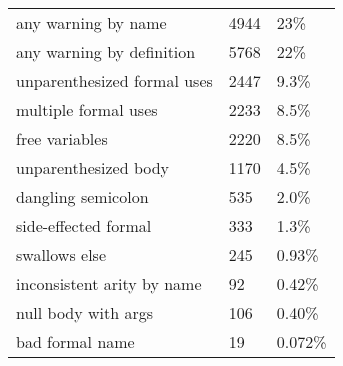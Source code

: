 \begin{tabular}{|l|l|l|} \hline
any warning by name & 4944 & 23\% \\ 
any warning by definition & 5768 & 22\% \\ 
unparenthesized formal uses & 2447 & 9.3\% \\ 
multiple formal uses & 2233 & 8.5\% \\ 
free variables & 2220 & 8.5\% \\ 
unparenthesized body & 1170 & 4.5\% \\ 
dangling semicolon & 535 & 2.0\% \\ 
side-effected formal & 333 & 1.3\% \\ 
swallows else & 245 & 0.93\% \\ 
inconsistent arity by name & 92 & 0.42\% \\ 
null body with args & 106 & 0.40\% \\ 
bad formal name & 19 & 0.072\% \\ 
\hline
\end{tabular}
